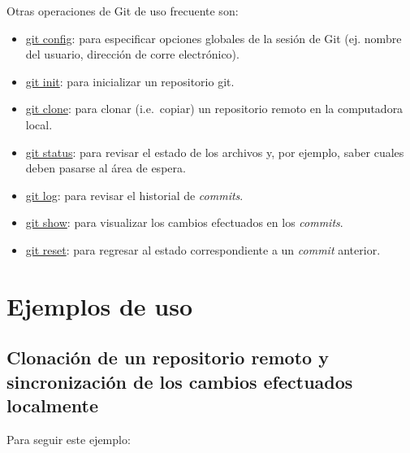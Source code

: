 \documentclass[
  letterpaper,
  DIV=11,
  numbers=noendperiod]{scrreprt}
\providecommand{\tightlist}{%
  \setlength{\itemsep}{0pt}\setlength{\parskip}{0pt}}\usepackage{longtable,booktabs,array}
\begin{document}
Otras operaciones de Git de uso frecuente son:

\begin{itemize}
\tightlist
\item
  \href{https://git-scm.com/docs/git-config}{git config}: para
  especificar opciones globales de la sesión de Git (ej. nombre del
  usuario, dirección de corre electrónico).
\item
  \href{https://git-scm.com/docs/git-init}{git init}: para inicializar
  un repositorio git.
\item
  \href{https://git-scm.com/docs/git-clone}{git clone}: para clonar
  (i.e.~copiar) un repositorio remoto en la computadora local.
\item
  \href{https://git-scm.com/docs/git-status}{git status}: para revisar
  el estado de los archivos y, por ejemplo, saber cuales deben pasarse
  al área de espera.
\item
  \href{https://git-scm.com/docs/git-log}{git log}: para revisar el
  historial de \emph{commits}.
\item
  \href{https://git-scm.com/docs/git-show}{git show}: para visualizar
  los cambios efectuados en los \emph{commits}.
\item
  \href{https://git-scm.com/docs/git-reset}{git reset}: para regresar al
  estado correspondiente a un \emph{commit} anterior.
\end{itemize}

\hypertarget{ejemplos-de-uso}{%
\section{Ejemplos de uso}\label{ejemplos-de-uso}}

\hypertarget{clonaciuxf3n-de-un-repositorio-remoto-y-sincronizaciuxf3n-de-los-cambios-efectuados-localmente}{%
\subsection{Clonación de un repositorio remoto y sincronización de los
cambios efectuados
localmente}\label{clonaciuxf3n-de-un-repositorio-remoto-y-sincronizaciuxf3n-de-los-cambios-efectuados-localmente}}

Para seguir este ejemplo:
\end{document}
